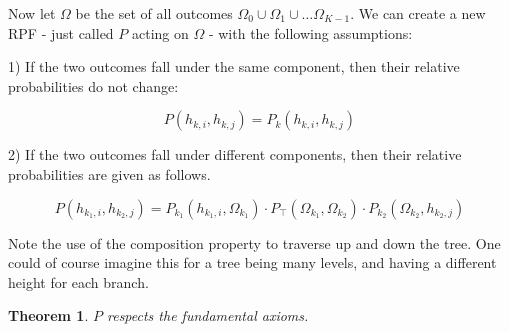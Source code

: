\documentclass[twoside]{article}
\theoremstyle{plain}%
\newtheorem{theorem}{Theorem}[section]
\theoremstyle{definition}
\theoremstyle{remark}
\begin{document}

Now let \(\Omega\) be the set of all outcomes \(\Omega_0 \cup \Omega_1 \cup \dots \Omega_{K-1}\). We can create a new RPF - just called \(P\) acting on \(\Omega\) - with the following assumptions:

1) If the two outcomes fall under the same component, then their relative probabilities do not change:

\begin{equation}
\label{rpf_composition_same_branch}
P(h_{k, i}, h_{k, j}) = P_k(h_{k, i}, h_{k, j})
\end{equation}

2) If the two outcomes fall under different components, then their relative probabilities are given as follows.

\begin{equation}
\label{eq:rpf_composition_different_branch}
P(h_{k_1, i}, h_{k_2, j}) = P_{k_1}(h_{k_1, i}, \Omega_{k_1}) \cdot  P_{\top}(\Omega_{k_1}, \Omega_{k_2}) \cdot P_{k_2}(\Omega_{k_2}, h_{k_2, j})
\end{equation}

Note the use of the composition property to traverse up and down the tree. One could of course imagine this for a tree being many levels, and having a different height for each branch.

\begin{theorem}
\(P\) respects the fundamental axioms.
\end{theorem}
\end{document}
